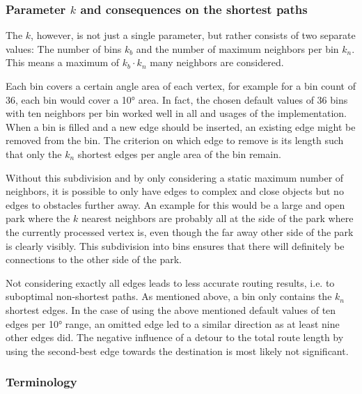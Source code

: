 			\subsubsection{Parameter $k$ and consequences on the shortest paths}
			
				The $k$, however, is not just a single parameter, but rather consists of two separate values:
				The number of bins $k_b$ and the number of maximum neighbors per bin $k_n$.
				This means a maximum of $k_b \cdot k_n$ many neighbors are considered.
				
				Each bin covers a certain angle area of each vertex, for example for a bin count of 36, each bin would cover a 10° area.
				In fact, the chosen default values of 36 bins with ten neighbors per bin worked well in all and usages of the implementation.
				When a bin is filled and a new edge should be inserted, an existing edge might be removed from the bin.
				The criterion on which edge to remove is its length such that only the $k_n$ shortest edges per angle area of the bin remain.
				
				Without this subdivision and by only considering a static maximum number of neighbors, it is possible to only have edges to complex and close objects but no edges to obstacles further away.
				An example for this would be a large and open park where the $k$ nearest neighbors are probably all at the side of the park where the currently processed vertex is, even though the far away other side of the park is clearly visibly.
				This subdivision into bins ensures that there will definitely be connections to the other side of the park.
				
				Not considering exactly all edges leads to less accurate routing results, i.e. to suboptimal non-shortest paths.
				As mentioned above, a bin only contains the $k_n$ shortest edges.
				In the case of using the above mentioned default values of ten edges per 10° range, an omitted edge led to a similar direction as at least nine other edges did.
				The negative influence of a detour to the total route length by using the second-best edge towards the destination is most likely not significant.
			
			\subsubsection{Terminology}
			
